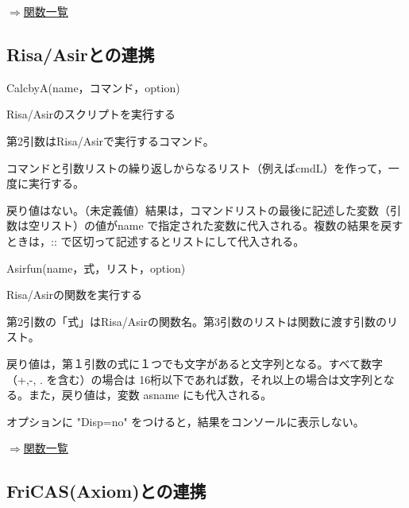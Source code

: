 \documentclass[papersize,a4paper,12pt,uplatex]{jsarticle}
\begin{document}
\begin{flushright}\hyperlink{functionlist}{$\Rightarrow$関数一覧}\end{flushright}
\newpage


\subsection{Risa/Asirとの連携}

\begin{description}

\hypertarget{calcbyA}{}
\item[関数]CalcbyA(name，コマンド，option)
\item[機能]Risa/Asirのスクリプトを実行する
\item[説明]第2引数はRisa/Asirで実行するコマンド。

コマンドと引数リストの繰り返しからなるリスト（例えばcmdL）を作って，一度に実行する。

戻り値はない。（未定義値）結果は，コマンドリストの最後に記述した変数（引数は空リスト）の値がname で指定された変数に代入される。複数の結果を戻すときは，:: で区切って記述するとリストにして代入される。


\vspace{\baselineskip}
\hypertarget{asirfun}{}
\item[関数]Asirfun(name，式，リスト，option)
\item[機能]Risa/Asirの関数を実行する
\item[説明]第2引数の「式」はRisa/Asirの関数名。第3引数のリストは関数に渡す引数のリスト。

戻り値は，第１引数の式に１つでも文字があると文字列となる。すべて数字（+,-, . を含む）の場合は
16桁以下であれば数，それ以上の場合は文字列となる。また，戻り値は，変数 asname にも代入される。

オプションに "Disp=no" をつけると，結果をコンソールに表示しない。


\end{description}
\begin{flushright}\hyperlink{functionlist}{$\Rightarrow$関数一覧}\end{flushright}

\subsection{FriCAS(Axiom)との連携}
\end{document}
